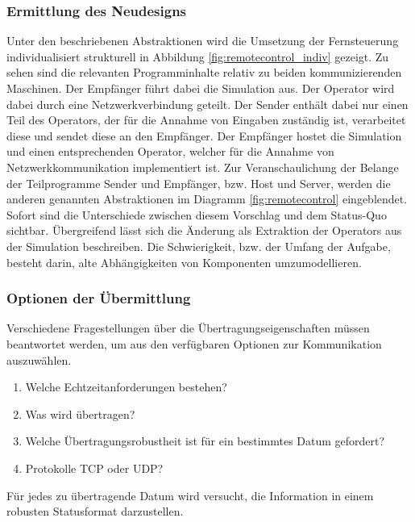 \subsubsection{Ermittlung des Neudesigns}
Unter den beschriebenen Abstraktionen wird die Umsetzung der Fernsteuerung individualisiert strukturell in Abbildung \ref{fig:remotecontrol_indiv} gezeigt. 
Zu sehen sind die relevanten Programminhalte relativ zu beiden kommunizierenden Maschinen.
Der Empfänger führt dabei die Simulation aus. Der Operator wird dabei durch eine Netzwerkverbindung geteilt.
Der Sender enthält dabei nur einen Teil des Operators, der für die Annahme von Eingaben zuständig ist, verarbeitet diese und sendet diese an den Empfänger.
Der Empfänger hostet die Simulation und einen entsprechenden Operator, welcher für die Annahme von Netzwerkkommunikation implementiert ist.
Zur Veranschaulichung der Belange der Teilprogramme Sender und Empfänger, bzw. Host und Server, werden die anderen genannten Abstraktionen im Diagramm \ref{fig:remotecontrol} eingeblendet.
Sofort sind die Unterschiede zwischen diesem Vorschlag und dem Status-Quo sichtbar.
Übergreifend lässt sich die Änderung als Extraktion der Operators aus der Simulation beschreiben. Die Schwierigkeit, bzw. der Umfang der Aufgabe, besteht darin, alte Abhängigkeiten von Komponenten umzumodellieren.\\

\subsubsection{Optionen der Übermittlung}
Verschiedene Fragestellungen über die Übertragungseigenschaften müssen beantwortet werden, um aus den verfügbaren Optionen zur Kommunikation auszuwählen.\\





\begin{enumerate}
\item Welche Echtzeitanforderungen bestehen?
\item Was wird übertragen?
\item Welche Übertragungsrobustheit ist für ein bestimmtes Datum gefordert?
\item Protokolle TCP oder UDP?
\end{enumerate}



Für jedes zu übertragende Datum wird versucht, die Information in einem robusten Statusformat darzustellen.






